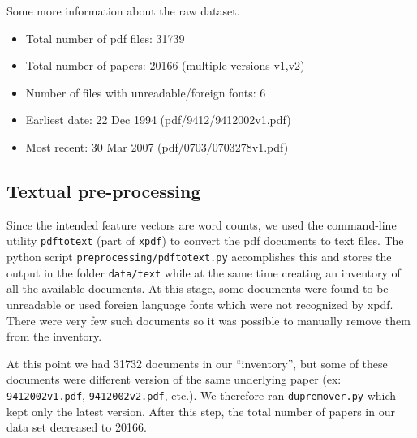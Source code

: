 \documentclass[11pt]{article}
\newcommand{\file}[1]{\texttt{#1}}
\newcommand{\program}[1]{\texttt{#1}}
\begin{document}
	
	
	Some more information about the raw dataset.
	\begin{itemize}
		\item Total number of pdf files: 31739
        \item Total number of papers: 20166 (multiple versions v1,v2)
        \item Number of files with unreadable/foreign fonts: 6
		\item Earliest date: 22 Dec 1994  (pdf/9412/9412002v1.pdf)
		\item Most recent:  30 Mar 2007 (pdf/0703/0703278v1.pdf)
	\end{itemize}
	
	
	
	\subsection{Textual pre-processing}

        Since the intended feature vectors are word counts, we used the command-line utility
        \texttt{pdftotext} (part of \program{xpdf}) to convert the pdf documents to text files.
        The python script \file{preprocessing/pdftotext.py} accomplishes this and stores the
        output in the folder \file{data/text} while at the same time creating an inventory of
        all the available documents.
        At this stage, some documents were found to be unreadable or used foreign language fonts
        which were not recognized by xpdf. There were very few such documents so it was possible
        to manually remove them from the inventory.

        At this point we had 31732 documents in our ``inventory'', but some of these documents
        were different version of the same underlying paper (ex: \file{9412002v1.pdf},
        \file{9412002v2.pdf}, etc.).
        We therefore ran \program{dupremover.py} which kept only the latest version.
        After this step, the total number of papers in our data set decreased to 20166.
\end{document}
